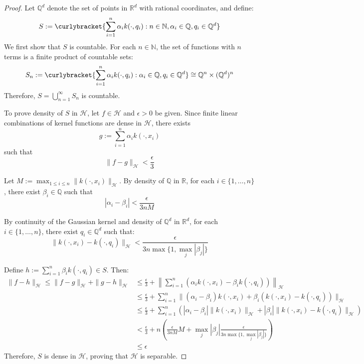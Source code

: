 \begin{proof}
Let $\mathbb{Q}^d$ denote the set of points in $\mathbb{R}^d$ with rational coordinates, and define:
$$S := \curlybracket{\sum_{i=1}^n \alpha_i k(\cdot,q_i) : n \in \mathbb{N}, \alpha_i \in \mathbb{Q}, q_i \in \mathbb{Q}^d}$$
We first show that $S$ is countable. For each $n \in \mathbb{N}$, the set of functions with $n$ terms is a finite product of countable sets:
$$S_n := \curlybracket{\sum_{i=1}^n \alpha_i k(\cdot,q_i) : \alpha_i \in \mathbb{Q}, q_i \in \mathbb{Q}^d} \cong \mathbb{Q}^n \times (\mathbb{Q}^d)^n$$
Therefore, $S = \bigcup_{n=1}^\infty S_n$ is countable.

To prove density of $S$ in $\mathcal{H}$, let $f \in \mathcal{H}$ and $\epsilon > 0$ be given. Since finite linear combinations of kernel functions are dense in $\mathcal{H}$, there exists
$$g := \sum_{i=1}^n \alpha_i k(\cdot,x_i)$$
such that
$$\|f - g\|_\mathcal{H} < \frac{\epsilon}{3}$$

Let $M := \max_{1 \leq i \leq n} \|k(\cdot,x_i)\|_\mathcal{H}$. By density of $\mathbb{Q}$ in $\mathbb{R}$, for each $i \in \{1,\ldots,n\}$, there exist $\beta_i \in \mathbb{Q}$ such that
$$|\alpha_i - \beta_i| < \frac{\epsilon}{3nM}$$

By continuity of the Gaussian kernel and density of $\mathbb{Q}^d$ in $\mathbb{R}^d$, for each $i \in \{1,\ldots,n\}$, there exist $q_i \in \mathbb{Q}^d$ such that:
$$\|k(\cdot,x_i) - k(\cdot,q_i)\|_\mathcal{H} < \frac{\epsilon}{3n\max\{1,\max_{j}|\beta_j|\}}$$

Define $h := \sum_{i=1}^n \beta_i k(\cdot,q_i) \in S$. Then:
\begin{align*}
\|f - h\|_\mathcal{H} \leq \|f - g\|_\mathcal{H} + \|g - h\|_\mathcal{H} 
&\leq \frac{\epsilon}{3} + \left\|\sum_{i=1}^n (\alpha_i k(\cdot,x_i) - \beta_i k(\cdot,q_i))\right\|_\mathcal{H} \\
&\leq \frac{\epsilon}{3} + \sum_{i=1}^n \|(\alpha_i - \beta_i)k(\cdot,x_i) + \beta_i(k(\cdot,x_i) - k(\cdot,q_i))\|_\mathcal{H} \\
&\leq \frac{\epsilon}{3} + \sum_{i=1}^n \left(|\alpha_i - \beta_i|\|k(\cdot,x_i)\|_\mathcal{H} + |\beta_i|\|k(\cdot,x_i) - k(\cdot,q_i)\|_\mathcal{H}\right) \\
&< \frac{\epsilon}{3} + n\left(\frac{\epsilon}{3nM}M + \max_{j}|\beta_j|\frac{\epsilon}{3n\max\{1,\max_{j}|\beta_j|\}}\right) \\
&\leq \epsilon
\end{align*}
Therefore, $S$ is dense in $\mathcal{H}$, proving that $\mathcal{H}$ is separable.
\end{proof}

